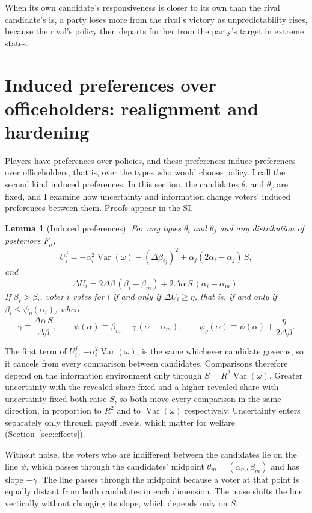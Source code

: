\documentclass[12pt,letterpaper]{article}
\newtheorem{lemma}{Lemma}
\begin{document}
When its own candidate's responsiveness is closer to its own than the rival candidate's is, a party loses more from the rival's victory as unpredictability rises, because the rival's policy then departs further from the party's target in extreme states.

\section{Induced preferences over officeholders: realignment and hardening}\label{sec:realign}

Players have preferences over policies, and these preferences induce preferences over officeholders, that is, over the types who would choose policy. I call the second kind induced preferences. In this section, the candidates $\theta_l$ and $\theta_r$ are fixed, and I examine how uncertainty and information change voters' induced preferences between them. Proofs appear in the SI.

\begin{lemma}[Induced preferences]\label{lem:payoff}
For any types $\theta_i$ and $\theta_j$ and any distribution of posteriors $F_\mu$,
\[
U_i^j=-\alpha_i^2\operatorname{Var}(\omega)-(\Delta\beta_{ij})^2+\alpha_j(2\alpha_i-\alpha_j)\,S,
\]
and
\[
\Delta U_i=2\Delta\beta\,(\beta_i-\beta_m)+2\Delta\alpha\,S\,(\alpha_i-\alpha_m).
\]
If $\beta_r>\beta_l$, voter $i$ votes for $l$ if and only if $\Delta U_i\ge\eta$, that is, if and only if $\beta_i\le\psi_\eta(\alpha_i)$, where
\[
\gamma\equiv\frac{\Delta\alpha\,S}{\Delta\beta},\qquad
\psi(\alpha)\equiv\beta_m-\gamma\,(\alpha-\alpha_m),\qquad
\psi_\eta(\alpha)\equiv\psi(\alpha)+\frac{\eta}{2\Delta\beta}.
\]
\end{lemma}

The first term of $U_i^j$, $-\alpha_i^2\operatorname{Var}(\omega)$, is the same whichever candidate governs, so it cancels from every comparison between candidates. Comparisons therefore depend on the information environment only through $S=R^2\operatorname{Var}(\omega)$. Greater uncertainty with the revealed share fixed and a higher revealed share with uncertainty fixed both raise $S$, so both move every comparison in the same direction, in proportion to $R^2$ and to $\operatorname{Var}(\omega)$ respectively. Uncertainty enters separately only through payoff levels, which matter for welfare (Section~\ref{sec:effects}).

Without noise, the voters who are indifferent between the candidates lie on the line $\psi$, which passes through the candidates' midpoint $\theta_m=(\alpha_m,\beta_m)$ and has slope $-\gamma$. The line passes through the midpoint because a voter at that point is equally distant from both candidates in each dimension. The noise shifts the line vertically without changing its slope, which depends only on $S$.
\end{document}
